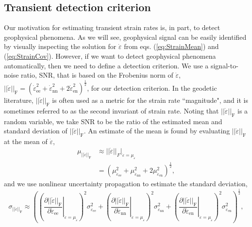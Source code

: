 \documentclass[extra,mreferee]{gji}
\begin{document}
\subsection{Transient detection criterion}\label{sec:TransientDetection}
Our motivation for estimating transient strain rates is, in part, to detect geophysical phenomena. As we will see, geophysical signal can be easily identified by visually inspecting the solution for $\dot\varepsilon$ from eqs. (\ref{eq:StrainMean}) and (\ref{eq:StrainCov}). However, if we want to detect geophysical phenomena automatically, then we need to define a detection criterion. We use a signal-to-noise ratio, SNR, that is based on the Frobenius norm of $\dot\varepsilon$, $||\dot\varepsilon||_\mathrm{F} = \left(\dot\varepsilon_{\mathrm{ee}}^2 + \dot\varepsilon_{\mathrm{nn}}^2 + 2\dot\varepsilon_{\mathrm{en}}^2\right)^{\frac{1}{2}}$, for our detection criterion. In the geodetic literature, $||\dot{\varepsilon}||_\mathrm{F}$ is often used as a metric for the strain rate ``magnitude", and it is sometimes referred to as the second invariant of strain rate. Noting that $||\dot\varepsilon||_\mathrm{F}$ is a random variable, we take SNR to be the ratio of the estimated mean and standard deviation of $||\dot\varepsilon||_\mathrm{F}$. An estimate of the mean is found by evaluating $||\dot\varepsilon||_\mathrm{F}$ at the mean of $\dot\varepsilon$, 
\begin{align}
\mu_{||\dot\varepsilon||_\mathrm{F}} &\approx ||\dot\varepsilon||_F \big|_{\dot\varepsilon = \mu_{\dot\varepsilon}} \\
                                     &= \left(\mu_{\dot\varepsilon_\mathrm{ee}}^2 + 
                                              \mu_{\dot\varepsilon_\mathrm{nn}}^2 + 
                                              2\mu_{\dot\varepsilon_\mathrm{en}}^2
                                     \right)^\frac{1}{2},
\end{align}
and we use nonlinear uncertainty propagation to estimate the standard deviation,
\begin{equation}
\sigma_{||\dot\varepsilon||_\mathrm{F}} \approx
\left(\left(\left. \frac{\partial ||\dot\varepsilon||_\mathrm{F}}{\partial \dot\varepsilon_\mathrm{ee}}\right|_{\dot\varepsilon = \mu_{\dot\varepsilon}} \right)^2 \sigma^2_{\dot\varepsilon_\mathrm{ee}} +
\left(\left. \frac{\partial ||\dot\varepsilon||_\mathrm{F}}{\partial \dot\varepsilon_\mathrm{nn}}\right|_{\dot\varepsilon = \mu_{\dot\varepsilon}} \right)^2 \sigma^2_{\dot\varepsilon_\mathrm{nn}} +
\left(\left. \frac{\partial ||\dot\varepsilon||_\mathrm{F}}{\partial \dot\varepsilon_\mathrm{en}}\right|_{\dot\varepsilon = \mu_{\dot\varepsilon}} \right)^2 \sigma^2_{\dot\varepsilon_\mathrm{en}}
\right)^\frac{1}{2},
\end{equation}
\end{document}
